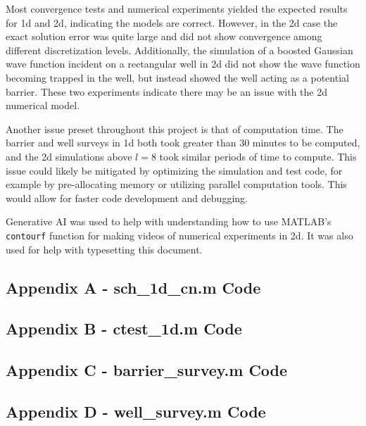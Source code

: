 \documentclass[10pt]{article}
\def\code#1{\texttt{#1}} %
\begin{document}
Most convergence tests and numerical experiments yielded the expected results for 1d and 
2d, indicating the models are correct. However, in the 2d case the exact solution error was quite large
and did not show convergence among different discretization levels. Additionally, the simulation of a 
boosted Gaussian wave function incident on a rectangular well in 2d did not show the wave function 
becoming trapped in the well, but instead showed the well acting as a potential barrier. These two 
experiments indicate there may be an issue with the 2d numerical model.

Another issue preset throughout this project is that of computation time. The barrier and well surveys
in 1d both took greater than 30 minutes to be computed, and the 2d simulations above $l=8$ took similar 
periods of time to compute. This issue could likely be mitigated by optimizing the simulation and test
code, for example by pre-allocating memory or utilizing parallel computation tools. This would allow 
for faster code development and debugging. 

Generative AI was used to help with understanding how to use MATLAB's \code{contourf} function for 
making videos of numerical experiments in 2d. It was also used for help with typesetting this 
document.

\pagebreak


\subsection*{Appendix A - sch\_1d\_cn.m Code}

\pagebreak

\subsection*{Appendix B - ctest\_1d.m Code}

\pagebreak

\subsection*{Appendix C - barrier\_survey.m Code}

\pagebreak

\subsection*{Appendix D - well\_survey.m Code}

\pagebreak
\end{document}
